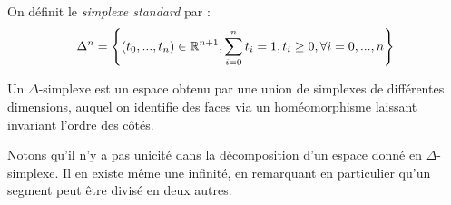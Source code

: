 \begin{exemple}
On définit le \emph{simplexe standard} par : \[\Delta^n=\left\{(t_0,...,t_n)\in\mathbb{R}^{n+1},\sum_{i=0}^nt_i=1,t_i\geq0,\forall i=0,...,n\right\}\]
\end{exemple}

\begin{definition}
Un $\Delta$-simplexe est un espace obtenu par une union de simplexes de différentes dimensions, auquel on identifie des faces via un homéomorphisme laissant invariant l'ordre des côtés.
\end{definition}

Notons qu'il n'y a pas unicité dans la décomposition d'un espace donné en $\Delta$-simplexe. Il en existe même une infinité, en remarquant en particulier qu'un segment peut être divisé en deux autres.

